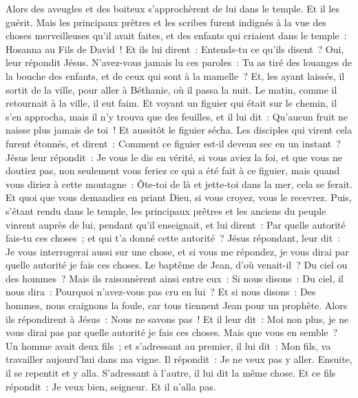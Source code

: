 \begin{multicols}{2}
Alors des aveugles et des boiteux s'approchèrent de lui dans le temple. Et il les guérit.
Mais les principaux prêtres et les scribes furent indignés à la vue des choses merveilleuses qu'il avait faites, et des enfants qui criaient dans le temple~: Hosanna au Fils de David~!
Et ils lui dirent~: Entends-tu ce qu'ils disent~? Oui, leur répondit Jésus. N'avez-vous jamais lu ces paroles~: Tu as tiré des louanges de la bouche des enfants, et de ceux qui sont à la mamelle~?
Et, les ayant laissés, il sortit de la ville, pour aller à Béthanie, où il passa la nuit.
Le matin, comme il retournait à la ville, il eut faim.
Et voyant un figuier qui était sur le chemin, il s'en approcha, mais il n'y trouva que des feuilles, et il lui dit~: Qu'aucun fruit ne naisse plus jamais de toi~! Et aussitôt le figuier sécha.
Les disciples qui virent cela furent étonnés, et dirent~: Comment ce figuier est-il devenu sec en un instant~?
Jésus leur répondit~: Je vous le dis en vérité, si vous aviez la foi, et que vous ne doutiez pas, non seulement vous feriez ce qui a été fait à ce figuier, mais quand vous diriez à cette montagne~: Ôte-toi de là et jette-toi dans la mer, cela se ferait.
Et quoi que vous demandiez en priant Dieu, si vous croyez, vous le recevrez.
Puis, s'étant rendu dans le temple, les principaux prêtres et les anciens du peuple vinrent auprès de lui, pendant qu'il enseignait, et lui dirent~: Par quelle autorité fais-tu ces choses~; et qui t'a donné cette autorité~?
Jésus répondant, leur dit~: Je vous interrogerai aussi sur une chose, et si vous me répondez, je vous dirai par quelle autorité je fais ces choses.
Le baptême de Jean, d'où venait-il~? Du ciel ou des hommes~? Mais ils raisonnèrent ainsi entre eux~: Si nous disons~: Du ciel, il nous dira~: Pourquoi n'avez-vous pas cru en lui~?
Et si nous disons~: Des hommes, nous craignons la foule, car tous tiennent Jean pour un prophète.
Alors ils répondirent à Jésus~: Nous ne savons pas~! Et il leur dit~: Moi non plus, je ne vous dirai pas par quelle autorité je fais ces choses.
Mais que vous en semble~? Un homme avait deux fils~; et s'adressant au premier, il lui dit~: Mon fils, va travailler aujourd'hui dans ma vigne.
Il répondit~: Je ne veux pas y aller. Ensuite, il se repentit et y alla.
S'adressant à l'autre, il lui dit la même chose. Et ce fils répondit~: Je veux bien, seigneur. Et il n'alla pas.

\end{multicols}
